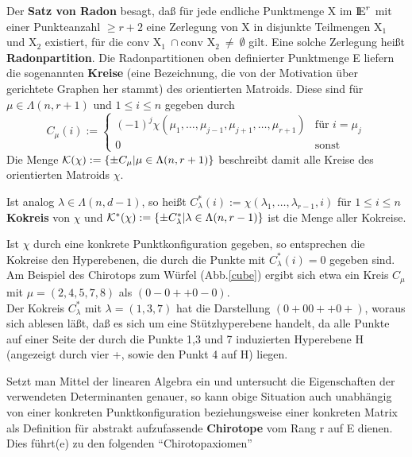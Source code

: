 Der {\bf Satz von Radon} besagt, daß für jede endliche Punktmenge X im $\mbox{$\rm I\!E$}^r$
mit einer Punkteanzahl $\geq r+2$ eine Zerlegung von X in disjunkte Teilmengen
X$_1$ und X$_2$ existiert, für die
$\mbox{conv X}_1~\cap\mbox{conv X}_2~\neq~\emptyset$ gilt. Eine solche
Zerlegung heißt {\bf Radonpartition}.
Die Radonpartitionen oben definierter Punktmenge E liefern die sogenannten
{\bf Kreise} (eine Bezeichnung, die von der Motivation über gerichtete
Graphen her stammt) des orientierten Matroids. Diese sind für
$\mu\in\Lambda(n,r+1)$ und $1\leq i\leq n$ gegeben durch
$$ C_\mu(i) := \left\{\begin{array}{ll}
   (-1)^j\chi(\mu_1,\ldots,\mu_{j-1},\mu_{j+1},\ldots,\mu_{r+1}) &
   \mbox{für } i=\mu_j\\
   0 & \mbox{sonst} \end{array} \right.$$
Die Menge ${\cal K}(\chi):=\{\pm C_\mu|\mu\in \Lambda (n,r+1)\}$ beschreibt
damit alle Kreise des orientierten Matroids $\chi$.

Ist analog $\lambda\in\Lambda (n,d-1)$, so heißt
$C^*_\lambda(i) := \chi(\lambda_1,\ldots,\lambda_{r-1},i)$ für
$1\leq i\leq n$ {\bf Kokreis}
von $\chi$\label{kokreis} und
${\cal K}^*(\chi) := \{\pm C^*_\lambda|\lambda\in\Lambda (n,r-1)\}$
ist die Menge aller Kokreise.

Ist $\chi$ durch eine konkrete Punktkonfiguration gegeben, so entsprechen
die Kokreise den Hyperebenen, die durch die Punkte mit $C^*_\lambda(i)=0$
gegeben sind. Am Beispiel des Chirotops zum Würfel (Abb.\ref{cube}) ergibt sich
etwa ein Kreis $C_\mu$ mit $\mu=(2,4,5,7,8)$ als $(0-0++0-0)$.\\
Der Kokreis $C^*_\lambda$ mit $\lambda=(1,3,7)$ hat die Darstellung
$(0+00++0+)$, woraus sich ablesen läßt, daß es sich um eine Stützhyperebene
handelt, da alle Punkte auf einer Seite der durch die Punkte 1,3 und 7
induzierten Hyperebene H (angezeigt durch vier +, sowie den Punkt 4 auf H) liegen.

Setzt man Mittel der linearen Algebra ein und untersucht die Eigenschaften
der verwendeten Determinanten genauer, so kann obige Situation auch
unabhängig von einer konkreten Punktkonfiguration beziehungsweise einer
konkreten Matrix als Definition für abstrakt aufzufassende {\bf Chirotope}
 vom Rang r auf E dienen. Dies führt(e) zu den folgenden
"`Chirotopaxiomen"'

\bcent
{}
\ecent

